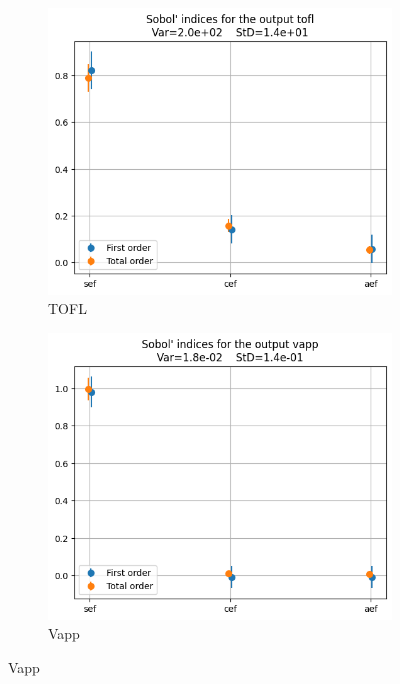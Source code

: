 \documentclass[a4paper, 11pt]{article}
\begin{document}
\begin{figure}[H]
    \vspace{10pt} %

    \begin{subfigure}[b]{0.45\textwidth}
        \includegraphics[width=\textwidth]{Images_Ayoub/Problem2/UseCase1/Sobol_Indices/tofl.png}
        \caption{TOFL}
        \label{fig:tofl}
    \end{subfigure}
    \hfill
    \begin{subfigure}[b]{0.45\textwidth}
        \includegraphics[width=\textwidth]{Images_Ayoub/Problem2/UseCase1/Sobol_Indices/vapp.png}
        \caption{Vapp}
        \label{fig:vapp}
    \end{subfigure}


\end{figure}
\end{document}
